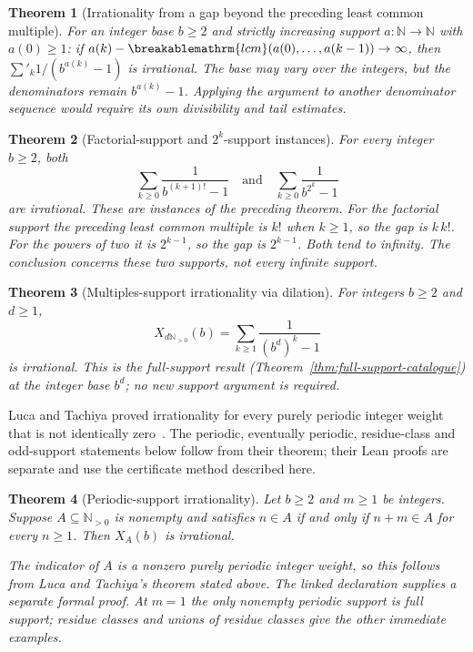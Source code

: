 \documentclass[11pt]{article}
\theoremstyle{plain}
\newtheorem{thm}{Theorem}[section]
\theoremstyle{definition}
\theoremstyle{remark}
\renewcommand{\mathrm}[1]{\ifmmode\breakablemathrm{#1}\else\textrm{#1}\fi}%
\newcommand{\Npos}{\mathbb{N}_{>0}}
\begin{document}
\begin{thm}[Irrationality from a gap beyond the preceding least common multiple]
\label{thm:lcm-gap-engine}
For an integer base $b\ge2$ and strictly increasing support $a:\mathbb N\to\mathbb N$ with $a(0)\ge
1$: if $a(k)-\mathrm{lcm}(a(0),\dots,a(k-1))\to\infty$, then $\sum'_k 1/(b^{a(k)}-1)$ is
irrational. The base may vary over the integers, but the denominators remain
$b^{a(k)}-1$.  Applying the argument to another denominator sequence
would require its own divisibility and tail estimates.
\end{thm}

\begin{thm}[Factorial-support and $2^k$-support instances]
\label{thm:factorial-twopow-support}
For every integer $b\ge2$, both
\[
 \sum_{k\ge0}\frac1{b^{(k+1)!}-1}
 \quad\text{and}\quad
 \sum_{k\ge0}\frac1{b^{2^k}-1}
\]
are irrational.  These are instances of the preceding theorem.  For the
factorial support the preceding least common multiple is $k!$ when
$k\ge1$, so the gap is $k\,k!$.  For the powers of two it is
$2^{k-1}$, so the gap is $2^{k-1}$.  Both tend to infinity.
The conclusion concerns these two supports, not every infinite support.
\end{thm}

\begin{thm}[Multiples-support irrationality via dilation]
\label{thm:multiples-support}
For integers $b\ge2$ and $d\ge1$,
\[
 X_{d\Npos}(b)=\sum_{k\ge1}\frac1{(b^d)^k-1}
\]
is irrational.  This is the full-support result
(Theorem~\ref{thm:full-support-catalogue}) at the integer base $b^d$;
no new support argument is required.
\end{thm}

Luca and Tachiya proved irrationality for every purely periodic integer weight that is not
identically zero~\cite[Theorem~A, p.~139]{lucatachiya2017}.  The periodic, eventually periodic,
residue-class and odd-support statements below follow from their theorem; their Lean proofs are
separate and use the certificate method described here.

\begin{thm}[Periodic-support irrationality]
\label{thm:periodic-support}
Let $b\ge2$ and $m\ge1$ be integers.  Suppose
$A\subseteq\Npos$ is nonempty and satisfies
$n\in A$ if and only if $n+m\in A$ for every $n\ge1$.
Then $X_A(b)$ is irrational.

The indicator of $A$ is a nonzero purely periodic integer weight,
so this follows from Luca and Tachiya's theorem stated above.
The linked declaration supplies a separate formal proof.
At $m=1$ the only nonempty periodic support is full support;
residue classes and unions of residue classes give the other
immediate examples.
\end{thm}
\end{document}

